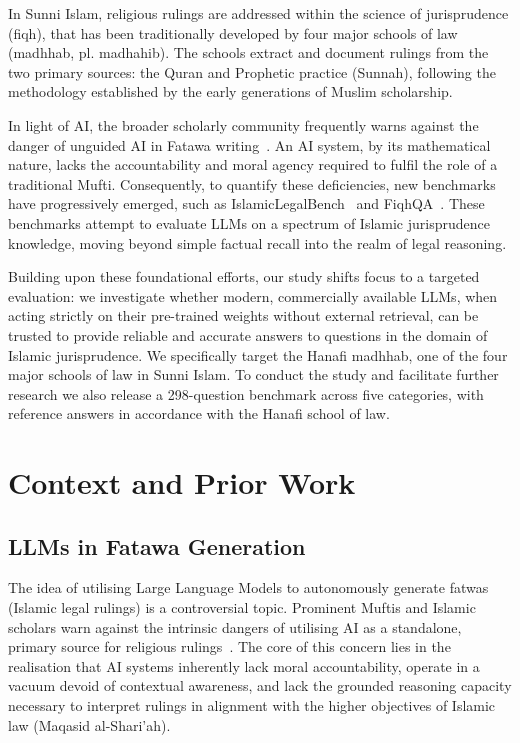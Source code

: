 \documentclass[runningheads]{llncs}
\begin{document}
In Sunni Islam, religious rulings are addressed within the science of jurisprudence (fiqh), that has been traditionally developed by four major schools of law (madhhab, pl. madhahib). The schools extract and document rulings from the two primary sources: the Quran and Prophetic practice (Sunnah), following the methodology established by the early generations of Muslim scholarship.

In light of AI, the broader scholarly community frequently warns against the danger of unguided AI in Fatawa writing~\cite{whitethread2025danger,patel2023building}. An AI system, by its mathematical nature, lacks the accountability and moral agency required to fulfil the role of a traditional Mufti. Consequently, to quantify these deficiencies, new benchmarks have progressively emerged, such as IslamicLegalBench~\cite{elmahjub2026islamiclegalbench} and FiqhQA~\cite{atif2025fiqhqa}. These benchmarks attempt to evaluate LLMs on a spectrum of Islamic jurisprudence knowledge, moving beyond simple factual recall into the realm of legal reasoning.

Building upon these foundational efforts, our study shifts focus to a targeted evaluation: we investigate whether modern, commercially available LLMs, when acting strictly on their pre-trained weights without external retrieval, can be trusted to provide reliable and accurate answers to questions in the domain of Islamic jurisprudence. We specifically target the Hanafi madhhab, one of the four major schools of law in Sunni Islam. To conduct the study and facilitate further research we also release a 298-question benchmark across five categories, with reference answers in accordance with the Hanafi school of law.

\section{Context and Prior Work}

\subsection{LLMs in Fatawa Generation}
The idea of utilising Large Language Models to autonomously generate fatwas (Islamic legal rulings) is a controversial topic. Prominent Muftis and Islamic scholars warn against the intrinsic dangers of utilising AI as a standalone, primary source for religious rulings~\cite{whitethread2025danger}. The core of this concern lies in the realisation that AI systems inherently lack moral accountability, operate in a vacuum devoid of contextual awareness, and lack the grounded reasoning capacity necessary to interpret rulings in alignment with the higher objectives of Islamic law (Maqasid al-Shari'ah).
\end{document}

